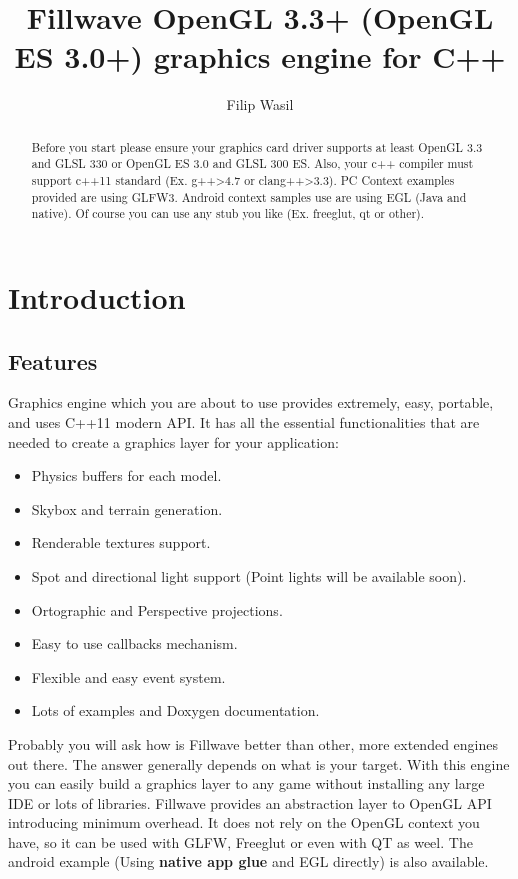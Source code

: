 \documentclass{article}
\begin{document}
\title{Fillwave
OpenGL 3.3+ (OpenGL ES 3.0+) graphics engine for C++ }
\author{Filip Wasil}

\maketitle

\begin{abstract}
Before you start please ensure your graphics card driver supports at least OpenGL 3.3 and GLSL 330 or OpenGL ES 3.0 and GLSL 300 ES. Also, your c++ compiler must support c++11 standard (Ex. g++\textgreater4.7 or clang++\textgreater3.3). PC Context examples provided are using GLFW3. Android context samples use are using EGL (Java and native). Of course you can use any stub you like (Ex. freeglut, qt or other).
\end{abstract}

\pagebreak
\tableofcontents

\newpage

\section{Introduction}
\subsection{Features}\label{sec:Features}
\indent \indent Graphics engine which you are about to use provides extremely, easy, portable, and uses C++11 modern API. It has all the essential functionalities that are needed to create a graphics layer for your application:

\begin{itemize}
  \item Physics buffers for each model.
  \item Skybox and terrain generation.
  \item Renderable textures support.
  \item Spot and directional light support (Point lights will be available soon).
  \item Ortographic and Perspective projections.
  \item Easy to use callbacks mechanism.
  \item Flexible and easy event system.
  \item Lots of examples and Doxygen documentation.
\end{itemize}

Probably you will ask how is Fillwave better than other, more extended engines out there. The answer generally depends on what is your target. With this engine you can easily build a graphics layer to any game without installing any large IDE or lots of libraries. Fillwave provides an abstraction layer to OpenGL API introducing minimum overhead. It does not rely on the OpenGL context you have, so it can be used with GLFW, Freeglut or even with QT as weel. The android example (Using \textbf{native app glue} and EGL directly) is also available.\newpage
\end{document}
